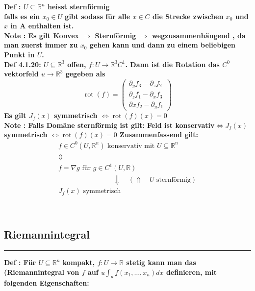 \documentclass[7pt,landscape, margin = 0.1mm]{article}
\newcommand*{\mysubsection}[1]{\vspace{-2mm}\color{chaptercolor}\subsection{ #1 }
\vspace{-1mm}\hrule\vspace{1.5mm}\color{black}
\vspace{2mm}}
\newcommand{\COL}[1]{ \color{chaptercolor} \bf{#1}\color{black}     \\}
\newcommand{\DEF}[2]{\color{chaptercolor}\bf{Def #1}:\color{black}    \hspace{0.2cm} #2 \\}
\newcommand{\NOTE}[2]{\color{chaptercolor}\bf{Note #1}:\color{black}    \hspace{0.2cm} #2 \\}
\begin{document}
\begin{multicols}{4}
\begin{flushleft}
\DEF{}{$U \subseteq \mathbb{R}^n$ heisst \COL{sternförmig} falls es ein $x_0 \in U$ gibt sodass für alle $x \in C$ die Strecke zwischen $x_0$ und $x$ in A enthalten ist.}

\NOTE{}{Es gilt Konvex $\Rightarrow$ Sternförmig $\Rightarrow$ wegzusammenhängend , da man zuerst immer zu $x_{0}$ gehen kann und dann zu einem beliebigen Punkt in $U$. }

\DEF{4.1.20}{$U \subseteq \mathbb{R}^3$ offen, $f: U \rightarrow \mathbb{R}^3 C^1$. Dann ist die Rotation das $C^0$ vektorfeld $u \rightarrow \mathbb{R}^3$ gegeben als
 $$
 \operatorname{rot}(f)=\left(\begin{array}{l}
 \partial_y f_3-\partial_z f_2 \\
 \partial_z f_1-\partial_x f_3 \\
 \partial x f_2-\partial_y f_1
 \end{array}\right)
 $$
 Es gilt $J_f(x)$ symmetrisch $\Leftrightarrow \operatorname{rot}(f)(x)=0$}

\NOTE{}{Falls Domäne sternförmig ist gilt: Feld ist konservativ$ \Leftrightarrow J_f(x)$ symmetrisch $\Leftrightarrow \operatorname{rot}(f)(x)=0$
Zusammenfassend gilt:
\begin{gather*}  
f \in C^{0}(U,\mathbb{R}^{n})\text{ konservativ mit }U \subseteq \mathbb{R}^{n}\\  
\Updownarrow\\  
f=\nabla g\text{ für }g\in C^{1}(U,\mathbb{R})\\  
\qquad\qquad\qquad\qquad \Downarrow \quad(\Uparrow\quad U \text{ sternförmig})\\  
J_{f}(x) \text{ symmetrisch}  
\end{gather*}

 }



\mysubsection{Riemannintegral}




\DEF{}{
Für $U \subseteq \mathbb{R}^n$ kompakt, $f: U \rightarrow \mathbb{R}$ stetig kann man das (Riemannintegral von $f$ auf $u \int_u f\left(x_1, \ldots, x_n\right) d x$ definieren, mit folgenden Eigenschaften:

}
\end{flushleft}
\end{multicols}
\end{document}
